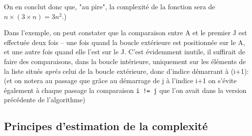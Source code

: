 \documentclass[12pt]{article}
\begin{document}
\begin{MaReponse}
\begin{alphenum}
			On en conclut donc que, "au pire", la complexité de la fonction sera de $n \times (3 \times n) = 3n^2$.)
			
			\item Dans l'exemple, on peut constater que la comparaison entre A et le premier J est effectuée deux fois -- une fois quand la boucle extérieure est positionnée sur le A, et une autre fois quand elle l'est sur le J. C'est évidemment inutile, il suffirait de faire des comparaisons, dans la boucle intérieure, uniquement sur les éléments de la liste situés \textit{après} celui de la boucle extérieure, donc d'indice démarrant à (i+1):
			(et on notera au passage que grâce au démarrage de j à l'indice i+1 on s'évite également à chaque passage la comparaison \texttt{i != j} que l'on avait dans la version précédente de l'algorithme)
		\end{alphenum}
		
	\end{MaReponse}
	
	\subsection{Principes d'estimation de la complexité}
	
\end{document}
